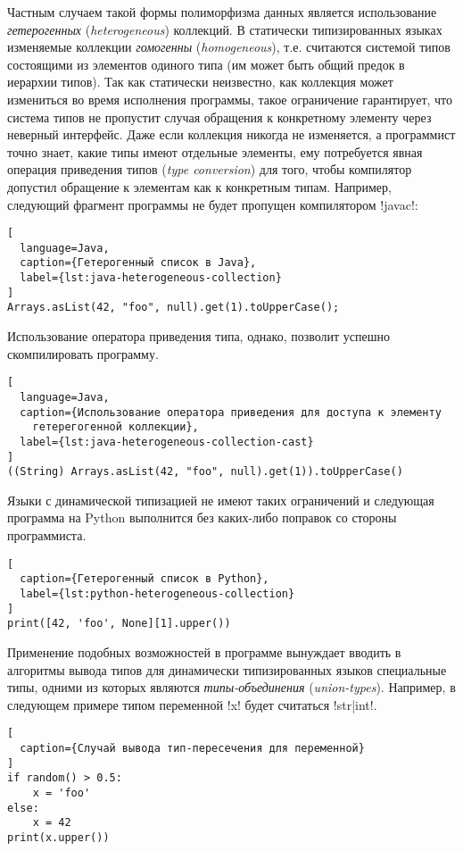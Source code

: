 Частным случаем такой формы полиморфизма данных является использование
\emph{гетерогенных} (\emph{heterogeneous}) коллекций. В статически
типизированных языках изменяемые коллекции \emph{гомогенны}
(\emph{homogeneous}), т.е. считаются системой типов состоящими из элементов
одиного типа (им может быть общий предок в иерархии типов).  Так как статически
неизвестно, как коллекция может измениться во время исполнения программы,
такое ограничение гарантирует, что система типов не пропустит случая обращения к
конкретному элементу через неверный интерфейс. Даже если коллекция никогда не
изменяется, а программист точно знает, какие типы имеют отдельные элементы, ему
потребуется явная операция приведения типов (\emph{type conversion}) для того, чтобы
компилятор допустил обращение к элементам как к конкретным типам. Например,
следующий фрагмент программы не будет пропущен компилятором !javac!:

\begin{lstlisting}[
  language=Java,
  caption={Гетерогенный список в Java},
  label={lst:java-heterogeneous-collection}
]
Arrays.asList(42, "foo", null).get(1).toUpperCase();
\end{lstlisting}

Использование оператора приведения типа, однако, позволит успешно скомпилировать
программу.

\newpage
\begin{lstlisting}[
  language=Java,
  caption={Использование оператора приведения для доступа к элементу
    гетерегогенной коллекции},
  label={lst:java-heterogeneous-collection-cast}
]
((String) Arrays.asList(42, "foo", null).get(1)).toUpperCase()
\end{lstlisting}

Языки с динамической типизацией не имеют таких ограничений и следующая программа
на Python выполнится без каких-либо поправок со стороны программиста.

\begin{lstlisting}[
  caption={Гетерогенный список в Python},
  label={lst:python-heterogeneous-collection}
]
print([42, 'foo', None][1].upper())
\end{lstlisting}

Применение подобных возможностей в программе вынуждает вводить в
алгоритмы вывода типов для динамически типизированных языков специальные типы,
одними из которых являются \emph{типы-объединения} (\emph{union-types}).
Например, в следующем примере типом переменной !x! будет считаться !str|int!.

\begin{lstlisting}[
  caption={Случай вывода тип-пересечения для переменной}
]
if random() > 0.5:
    x = 'foo'
else:
    x = 42
print(x.upper())
\end{lstlisting}

